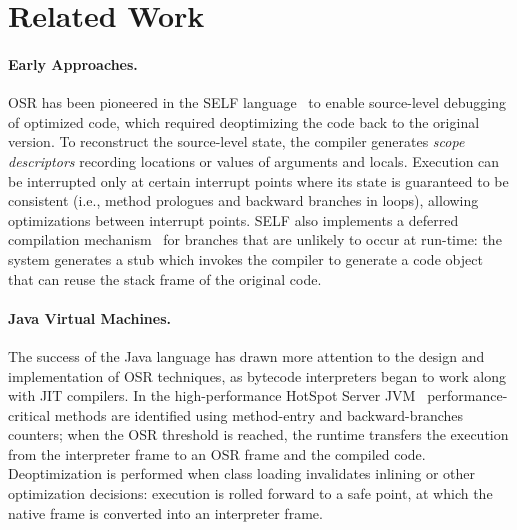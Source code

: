 \section{Related Work}
\label{se:related}

\paragraph{Early Approaches.}

OSR has been pioneered in the SELF language~\cite{holzle1992self} to enable source-level debugging of optimized code, which required deoptimizing the code back to the original version. To reconstruct the source-level state, the compiler generates {\em scope descriptors} recording locations or values of arguments and locals. Execution can be interrupted only at certain interrupt points where its state is guaranteed to be consistent (i.e., method prologues and backward branches in loops), allowing optimizations between interrupt points. SELF also implements a deferred compilation mechanism~\cite{chambers1991self} for branches that are unlikely to occur at run-time: the system generates a stub which invokes the compiler to generate a code object that can reuse the stack frame of the original code.

\paragraph{Java Virtual Machines.}
The success of the Java language has drawn more attention to the design and implementation of OSR techniques, as bytecode interpreters began to work along with JIT compilers. In the high-performance HotSpot Server JVM~\cite{paleczny2001hotspot} performance-critical methods are identified using method-entry and backward-branches counters; when the OSR threshold is reached, the runtime transfers the execution from the interpreter frame to an OSR frame and the compiled code. Deoptimization is performed when class loading invalidates inlining or other optimization decisions: execution is rolled forward to a safe point, at which the native frame is converted into an interpreter frame.

